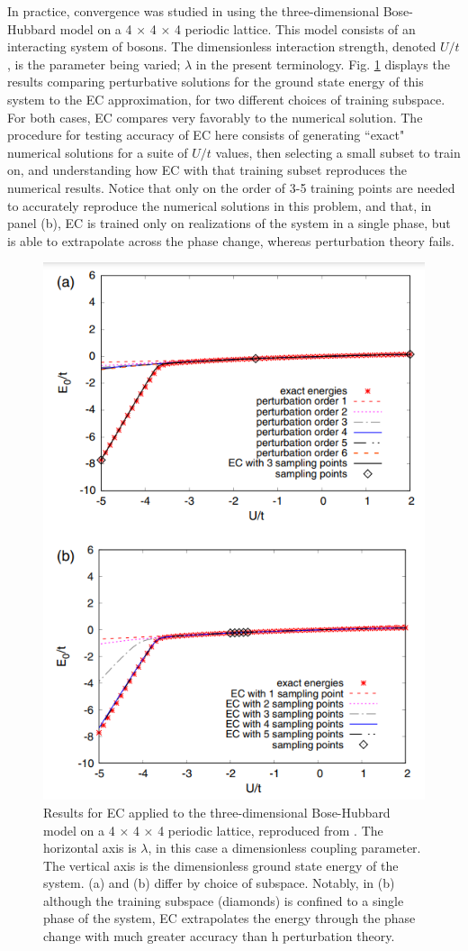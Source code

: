 \documentclass[%
 reprint,
 amsmath,amssymb,
 aps,
]{revtex4-2}
\begin{document}
In practice, convergence was studied in \cite{frame2018eigenvector} using the three-dimensional Bose-Hubbard model on a 4 × 4 × 4 periodic lattice. This model consists of an interacting system of bosons. The dimensionless interaction strength, denoted $U/t$, is the parameter being varied; $\lambda$ in the present terminology. Fig. \ref{fig:pt_vs_ec} displays the results comparing perturbative solutions for the ground state energy of this system to the \ac{EC} approximation, for
two different choices of training subspace. For both cases, \ac{EC} compares very favorably to the numerical solution. The procedure for testing accuracy of \ac{EC} here consists of generating ``exact" numerical solutions for a suite of $U/t$ values, then selecting a small subset to train on, and understanding how \ac{EC} with that training subset reproduces the numerical results. Notice that only on the order of 3-5 training points are needed to accurately reproduce the
numerical solutions in this problem, and that, in panel (b), \ac{EC} is trained only on realizations of the system in a single phase, but is able to extrapolate across the phase change, whereas perturbation theory fails.

\begin{figure}[htpb]
  \centering
  \includegraphics[width=0.8\linewidth]{./pt_vs_ec.png}
  \caption{Results for \ac{EC} applied to the three-dimensional Bose-Hubbard
  model on a 4 × 4 × 4 periodic lattice, reproduced from \cite{frame2018eigenvector}. The horizontal axis is $\lambda$, in this case a dimensionless coupling parameter. The vertical axis is the dimensionless ground state energy of the system. (a) and (b) differ by choice of subspace. Notably, in (b) although the training subspace (diamonds) is confined to a single phase of the system, \ac{EC} extrapolates the energy through the phase change with much greater accuracy than
  h
perturbation theory. }%
  \label{fig:pt_vs_ec}
\end{figure}
\end{document}
